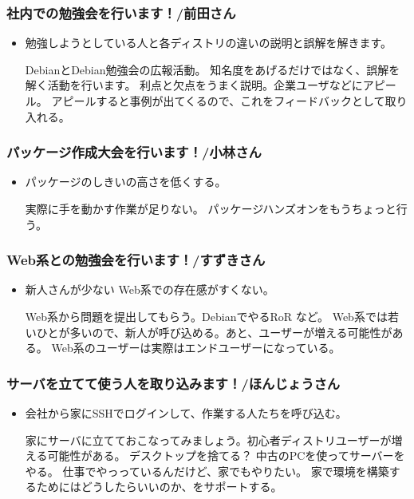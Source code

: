 \documentclass[mingoth,a4paper]{jsarticle}
\begin{document}
\subsubsection{社内での勉強会を行います！/前田さん}
\begin{itemize}
	\item 勉強しようとしている人と各ディストリの違いの説明と誤解を解きます。

	  DebianとDebian勉強会の広報活動。
	  知名度をあげるだけではなく、誤解を解く活動を行います。
	  利点と欠点をうまく説明。企業ユーザなどにアピール。
	  アピールすると事例が出てくるので、これをフィードバックとして取り入れる。
\end{itemize}

	
\subsubsection{パッケージ作成大会を行います！/小林さん}
\begin{itemize}
	\item パッケージのしきいの高さを低くする。
	
	実際に手を動かす作業が足りない。
	パッケージハンズオンをもうちょっと行う。
\end{itemize}

\subsubsection{Web系との勉強会を行います！/すずきさん}
\begin{itemize}
	\item 新人さんが少ない Web系での存在感がすくない。

	Web系から問題を提出してもらう。DebianでやるRoR など。
	Web系では若いひとが多いので、新人が呼び込める。あと、ユーザーが増える可能性がある。
	Web系のユーザーは実際はエンドユーザーになっている。
\end{itemize}

\subsubsection{サーバを立てて使う人を取り込みます！/ほんじょうさん}
\begin{itemize}
	\item 会社から家にSSHでログインして、作業する人たちを呼び込む。

	家にサーバに立てておこなってみましょう。初心者ディストリユーザーが増える可能性がある。
	デスクトップを捨てる？
	中古のPCを使ってサーバーをやる。
	仕事でやっっているんだけど、家でもやりたい。
	家で環境を構築するためにはどうしたらいいのか、をサポートする。
\end{itemize}
\end{document}
